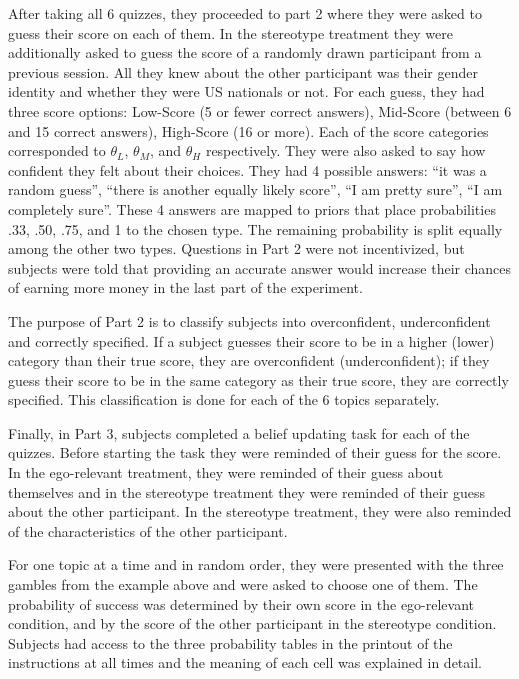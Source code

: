 \documentclass[
  12pt,
]{article}
\begin{document}
After taking all 6 quizzes, they proceeded to part 2 where they were
asked to guess their score on each of them. In the stereotype treatment
they were additionally asked to guess the score of a randomly drawn
participant from a previous session. All they knew about the other
participant was their gender identity and whether they were US nationals
or not. For each guess, they had three score options: Low-Score (5 or
fewer correct answers), Mid-Score (between 6 and 15 correct answers),
High-Score (16 or more). Each of the score categories corresponded to
\(\theta_L\), \(\theta_M\), and \(\theta_H\) respectively. They were
also asked to say how confident they felt about their choices. They had
4 possible answers: ``it was a random guess'', ``there is another
equally likely score'', ``I am pretty sure'', ``I am completely sure''.
These 4 answers are mapped to priors that place probabilities .33, .50,
.75, and 1 to the chosen type. The remaining probability is split
equally among the other two types. Questions in Part 2 were not
incentivized, but subjects were told that providing an accurate answer
would increase their chances of earning more money in the last part of
the experiment.

The purpose of Part 2 is to classify subjects into overconfident,
underconfident and correctly specified. If a subject guesses their score
to be in a higher (lower) category than their true score, they are
overconfident (underconfident); if they guess their score to be in the
same category as their true score, they are correctly specified. This
classification is done for each of the 6 topics separately.

Finally, in Part 3, subjects completed a belief updating task for each
of the quizzes. Before starting the task they were reminded of their
guess for the score. In the ego-relevant treatment, they were reminded
of their guess about themselves and in the stereotype treatment they
were reminded of their guess about the other participant. In the
stereotype treatment, they were also reminded of the characteristics of
the other participant.

For one topic at a time and in random order, they were presented with
the three gambles from the example above and were asked to choose one of
them. The probability of success was determined by their own score in
the ego-relevant condition, and by the score of the other participant in
the stereotype condition. Subjects had access to the three probability
tables in the printout of the instructions at all times and the meaning
of each cell was explained in detail.
\end{document}

